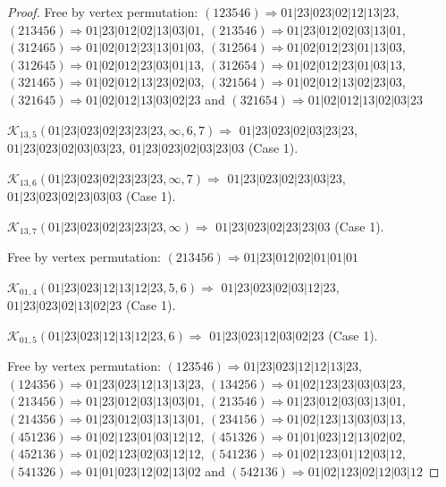 \documentclass[12pt]{article}
\theoremstyle{plain}
\theoremstyle{definition}
\theoremstyle{remark}
\newcommand{\fancy}[1]{\mathcal{#1}}
\def\K{\fancy{K}}
\begin{document}
\begin{proof}
	
	
	Free by vertex permutation: $(1 2 3 5 4 6)\Rightarrow 01|23|023|02|12|13|23$, $(2 1 3 4 5 6)\Rightarrow 01|23|012|02|13|03|01$, $(2 1 3 5 4 6)\Rightarrow 01|23|012|02|03|13|01$, $(3 1 2 4 6 5)\Rightarrow 01|02|012|23|13|01|03$, $(3 1 2 5 6 4)\Rightarrow 01|02|012|23|01|13|03$, $(3 1 2 6 4 5)\Rightarrow 01|02|012|23|03|01|13$, $(3 1 2 6 5 4)\Rightarrow 01|02|012|23|01|03|13$, $(3 2 1 4 6 5)\Rightarrow 01|02|012|13|23|02|03$, $(3 2 1 5 6 4)\Rightarrow 01|02|012|13|02|23|03$, $(3 2 1 6 4 5)\Rightarrow 01|02|012|13|03|02|23$ and $(3 2 1 6 5 4)\Rightarrow 01|02|012|13|02|03|23$
	
	
	
	\bigskip
	
	$\K_{13,5}(01|23|023|02|23|23|23,\infty,6, 7)\Rightarrow $ $01|23|023|02|03|23|23$, $01|23|023|02|03|03|23$, $01|23|023|02|03|23|03$ (Case 1).
	
	$\K_{13,6}(01|23|023|02|23|23|23,\infty,7)\Rightarrow $ $01|23|023|02|23|03|23$, $01|23|023|02|23|03|03$ (Case 1).
	
	$\K_{13,7}(01|23|023|02|23|23|23,\infty)\Rightarrow $ $01|23|023|02|23|23|03$ (Case 1).
	
	
	
	Free by vertex permutation: $(2 1 3 4 5 6)\Rightarrow 01|23|012|02|01|01|01$
	
	
	
	\bigskip
	
	$\K_{01,4}(01|23|023|12|13|12|23,5, 6)\Rightarrow $ $01|23|023|02|03|12|23$, $01|23|023|02|13|02|23$ (Case 1).
	
	$\K_{01,5}(01|23|023|12|13|12|23,6)\Rightarrow $ $01|23|023|12|03|02|23$ (Case 1).
	
	
	
	Free by vertex permutation: $(1 2 3 5 4 6)\Rightarrow 01|23|023|12|12|13|23$, $(1 2 4 3 5 6)\Rightarrow 01|23|023|12|13|13|23$, $(1 3 4 2 5 6)\Rightarrow 01|02|123|23|03|03|23$, $(2 1 3 4 5 6)\Rightarrow 01|23|012|03|13|03|01$, $(2 1 3 5 4 6)\Rightarrow 01|23|012|03|03|13|01$, $(2 1 4 3 5 6)\Rightarrow 01|23|012|03|13|13|01$, $(2 3 4 1 5 6)\Rightarrow 01|02|123|13|03|03|13$, $(4 5 1 2 3 6)\Rightarrow 01|02|123|01|03|12|12$, $(4 5 1 3 2 6)\Rightarrow 01|01|023|12|13|02|02$, $(4 5 2 1 3 6)\Rightarrow 01|02|123|02|03|12|12$, $(5 4 1 2 3 6)\Rightarrow 01|02|123|01|12|03|12$, $(5 4 1 3 2 6)\Rightarrow 01|01|023|12|02|13|02$ and $(5 4 2 1 3 6)\Rightarrow 01|02|123|02|12|03|12$
	
	
	
	\bigskip
	

\end{proof}
\end{document}
